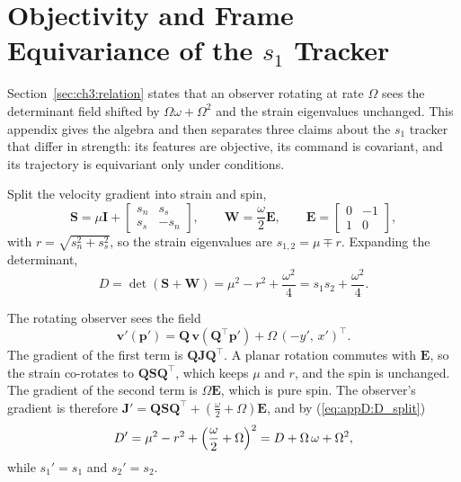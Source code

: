 \chapter{Objectivity and Frame Equivariance of the $s_1$ Tracker}
\label{app:frame_equivariance}

Section~\ref{sec:ch3:relation} states that an observer rotating at rate
$\Omega$ sees the determinant field shifted by $\Omega\omega + \Omega^2$
and the strain eigenvalues unchanged. This appendix gives the algebra and
then separates three claims about the $s_1$ tracker that differ in
strength: its features are objective, its command is covariant, and its
trajectory is equivariant only under conditions.

Split the velocity gradient into strain and spin,
\begin{equation}
    \mathbf{S} = \mu\mathbf{I} +
    \begin{bmatrix} s_n & s_s \\ s_s & -s_n \end{bmatrix},
    \qquad
    \mathbf{W} = \frac{\omega}{2}\mathbf{E}, \qquad
    \mathbf{E} = \begin{bmatrix} 0 & -1 \\ 1 & 0 \end{bmatrix},
    \label{eq:appD:split}
\end{equation}
with $r = \sqrt{s_n^2 + s_s^2}$, so the strain eigenvalues are
$s_{1,2} = \mu \mp r$. Expanding the determinant,
\begin{equation}
    D = \det(\mathbf{S} + \mathbf{W})
      = \mu^2 - r^2 + \frac{\omega^2}{4}
      = s_1 s_2 + \frac{\omega^2}{4}.
    \label{eq:appD:D_split}
\end{equation}

The rotating observer sees the field
\begin{equation}
    \mathbf{v}'(\mathbf{p}') = \mathbf{Q}\,\mathbf{v}(\mathbf{Q}^{\top}\mathbf{p}')
        + \Omega\,(-y',\, x')^{\top}.
    \label{eq:appD:rotating_field}
\end{equation}
The gradient of the first term is $\mathbf{Q}\mathbf{J}\mathbf{Q}^{\top}$.
A planar rotation commutes with $\mathbf{E}$, so the strain co-rotates to
$\mathbf{Q}\mathbf{S}\mathbf{Q}^{\top}$, which keeps $\mu$ and $r$, and
the spin is unchanged. The gradient of the second term is
$\Omega\mathbf{E}$, which is pure spin. The observer's gradient is
therefore
$\mathbf{J}' = \mathbf{Q}\mathbf{S}\mathbf{Q}^{\top} +
(\tfrac{\omega}{2} + \Omega)\mathbf{E}$, and by (\ref{eq:appD:D_split})
\begin{equation}
    D' = \mu^2 - r^2 + \Bigl(\frac{\omega}{2} + \Omega\Bigr)^2
       = D + \Omega\,\omega + \Omega^2 ,
    \label{eq:appD:shift}
\end{equation}
while $s_1' = s_1$ and $s_2' = s_2$.

